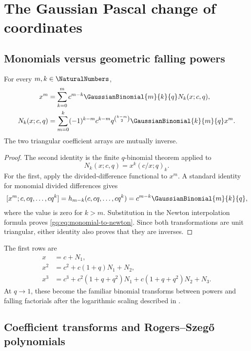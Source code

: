 \section{The Gaussian Pascal change of coordinates}
\label{gq:chap:gaussian-pascal}

\subsection{Monomials versus geometric falling powers}

\begin{theorem}
\label{gq:thm:gaussian-pascal-basis}
For every $m,k\in\NaturalNumbers$,
\begin{align}
 x^m
 &=\sum_{k=0}^m c^{m-k}\GaussianBinomial{m}{k}{q}N_k(x;c,q),
 \label{gq:eq:monomial-to-newton}\\
 N_k(x;c,q)
 &=\sum_{m=0}^k(-1)^{k-m}c^{k-m}
   q^{\binom{k-m}{2}}\GaussianBinomial{k}{m}{q}x^m.
 \label{gq:eq:newton-to-monomial}
\end{align}
The two triangular coefficient arrays are mutually inverse.
\end{theorem}

\begin{proof}
The second identity is the finite $q$-binomial theorem applied to
\[
 N_k(x;c,q)=x^k(c/x;q)_k.
\]
For the first, apply the divided-difference functional to $x^m$.  A standard
identity for monomial divided differences gives
\[
 [x^m;c,cq,\ldots,cq^k]
 =h_{m-k}(c,cq,\ldots,cq^k)
 =c^{m-k}\GaussianBinomial{m}{k}{q},
\]
where the value is zero for $k>m$.  Substitution in the Newton interpolation
formula proves \eqref{gq:eq:monomial-to-newton}.  Since both transformations are
unit triangular, either identity also proves that they are inverses.
\end{proof}

\begin{example}
The first rows are
\begin{align*}
 x&=c+N_1,\\
 x^2&=c^2+c(1+q)N_1+N_2,\\
 x^3&=c^3+c^2(1+q+q^2)N_1
       +c(1+q+q^2)N_2+N_3.
\end{align*}
At $q\to1$, these become the familiar binomial transforms between powers and
falling factorials after the logarithmic scaling described in
.
\end{example}

\subsection{Coefficient transforms and Rogers--Szeg\H{o} polynomials}

